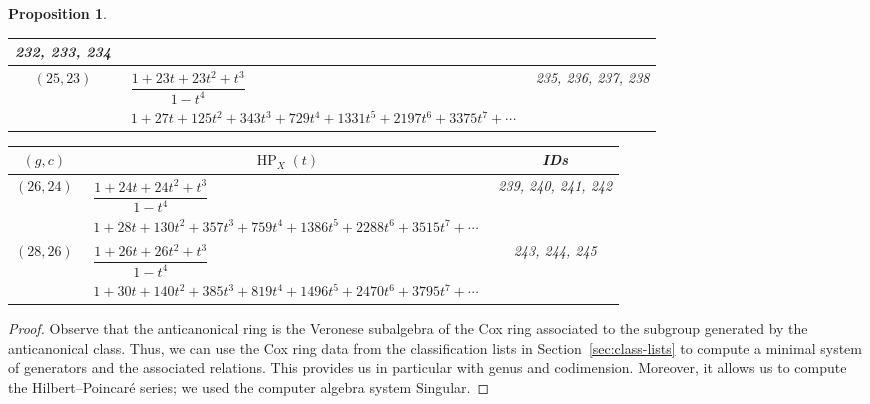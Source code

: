 \documentclass[10pt,a4paper]{amsart}
\newtheorem{prop}[thm]{Proposition}
\theoremstyle{definition}
\DeclareMathOperator\HP{HP}
\numberwithin{equation}{section}
\begin{document}
\begin{prop}
\begin{table}[h!]
\begin{tabu}{c|c|c}
\begin{minipage}{4cm}
 \rm
 	232, 233, 234
 \end{minipage}
	\\ \hline
	$(25,23)$\label{T(23,25)}
	&
	$\begin{array}{c}
	 \dfrac{1\!+\!23t\!+\!23t^2\!+\!t^3}{1-t^4} \\[3pt]
	 {1\!+\!27t\!+\!125t^2\!+\!343t^3\!+\!729t^4\!+\!1331t^5\!+\!2197t^6\!+\!3375t^7\!+\!\cdots}
	\end{array}$
	&
	 \begin{minipage}{4cm}
 \rm
 	235, 236, 237, 238
 \end{minipage}
	\\ \hline
\end{tabu}\vspace{4mm}
\end{table}

\begin{table}[h!]\centering\setlength{\tabcolsep}{3.5pt}
\renewcommand{\arraystretch}{1.45}\small\tabulinesep=1mm
\begin{tabu}{c|c|c}\hline
 $(g,c)$ & $\HP_X(t)$ & {\rm IDs}
 \\
 \hline
$(26,24)$\label{T(24,26)}
	&
	$\begin{array}{c}
	 \dfrac{1\!+\!24t\!+\!24t^2\!+\!t^3}{1-t^4} \\[3pt]
	 {1\!+\!28t\!+\!130t^2\!+\!357t^3\!+\!759t^4\!+\!1386t^5\!+\!2288t^6\!+\!3515t^7\!+\!\cdots}
	\end{array}$
	&
	 \begin{minipage}{4cm}
 \rm
 	239, 240, 241, 242
 \end{minipage}
	\\
\hline	
$(28,26)$\label{T(26,28)}
	&
	$\begin{array}{c}
	 \dfrac{1\!+\!26t\!+\!26t^2\!+\!t^3}{1-t^4} \\[3pt]
	 {1\!+\!30t\!+\!140t^2\!+\!385t^3\!+\!819t^4\!+\!1496t^5\!+\!2470t^6\!+\!3795t^7\!+\!\cdots}
	\end{array}$
	&
	 \begin{minipage}{4cm}
 \rm
 	243, 244, 245
 \end{minipage}
	\\
\hline
\end{tabu}%
\end{table}
\end{prop}



\begin{proof}
Observe that the anticanonical ring is the Veronese subalgebra
of the Cox ring associated to the subgroup generated by the
anticanonical class.
Thus, we can use the Cox ring data from the classification lists
in Section~\ref{sec:class-lists} to compute a minimal system of
generators and the associated relations.
This provides us in particular with genus and codimension.
Moreover, it allows us to compute the Hilbert--Poincar\'{e}
series; we used the computer algebra system Singular.
\end{proof}
\end{document}
